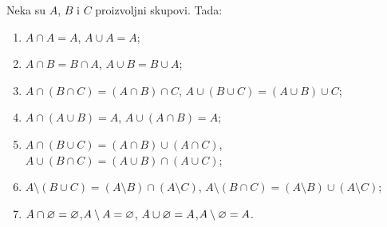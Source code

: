 \begin{THM}\label{ft06.thm.osnovne-osobine}
  Neka su $A$, $B$ i $C$ proizvoljni skupovi. Tada:
  \begin{enumerate}
  \item $A \cap A = A$,\newline
        $A \cup A = A$;
  \item $A \cap B = B \cap A$,\newline
        $A \cup B = B \cup A$;
  \item $A \cap (B \cap C) = (A \cap B) \cap C$,\newline
        $A \cup (B \cup C) = (A \cup B) \cup C$;
  \item $A \cap (A \cup B) = A$,\newline
        $A \cup (A \cap B) = A$;
  \item $A \cap (B \cup C) = (A \cap B) \cup (A \cap C)$,\newline
        $A \cup (B \cap C) = (A \cup B) \cap (A \cup C)$;
  \item $A \setminus (B \cup C) = (A \setminus B) \cap (A \setminus C)$,\newline
        $A \setminus (B \cap C) = (A \setminus B) \cup (A \setminus C)$;
  \item $A \cap \varnothing = \varnothing$,\quad$A \setminus A = \varnothing$,\newline
        $A \cup \varnothing = A$,\quad$A \setminus \varnothing = A$.
  \end{enumerate}
\end{THM}
